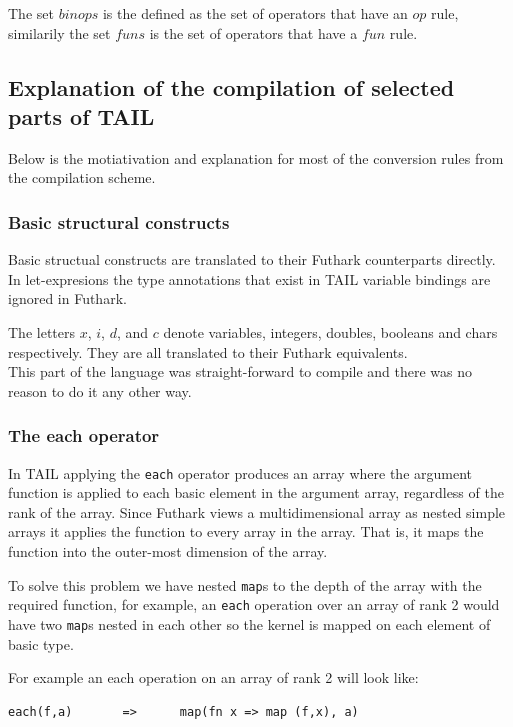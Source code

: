 \documentclass[11pt]{article}
\begin{document}
The set $binops$ is the defined as the set of operators that have an $op$ rule, similarily the set $funs$ is the set of
operators that have a $fun$ rule.

\subsection{Explanation of the compilation of selected parts of TAIL}
Below is the motiativation and explanation for most of the conversion rules from the compilation scheme. 

\subsubsection{Basic structural constructs} 
Basic structual constructs are translated to their Futhark counterparts directly.
In let-expresions the type annotations that exist in TAIL variable bindings are ignored in Futhark. 

The letters $x$, $i$, $d$, and $c$ denote variables, integers, doubles, booleans and chars respectively.
They are all translated to their Futhark equivalents.\\

This part of the language was straight-forward to compile and there was no reason to do it any other way.

\subsubsection{The each operator} 

In TAIL applying the {\tt each} operator produces an array where the argument function is applied to each basic element in the
argument array, regardless of the rank of the array.
Since Futhark views a multidimensional array as nested simple arrays it applies the function to every array in the array.
That is, it maps the function into the outer-most dimension of the array\cite{TroelsHenriksen}.
 
To solve this problem we have nested {\tt map}s to the depth of the array with the required function,
for example, an {\tt each} operation over an array of rank 2 would have two {\tt map}s nested in each other so the kernel is
mapped on each element of basic type.
 
For example an each operation on an array of rank 2 will look like:
\begin{lstlisting}[numbers=none,frame=none]
each(f,a)       =>      map(fn x => map (f,x), a)
\end{lstlisting}
\end{document}

